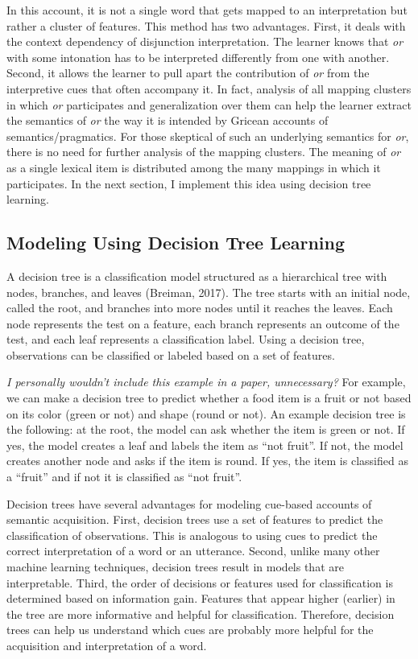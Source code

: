 \documentclass[floatsintext,man]{apa6}
\theoremstyle{definition}
\theoremstyle{definition}
\theoremstyle{definition}
\theoremstyle{remark}
\begin{document}
In this account, it is not a single word that gets mapped to an
interpretation but rather a cluster of features. This method has two
advantages. First, it deals with the context dependency of disjunction
interpretation. The learner knows that \emph{or} with some intonation
has to be interpreted differently from one with another. Second, it
allows the learner to pull apart the contribution of \emph{or} from the
interpretive cues that often accompany it. In fact, analysis of all
mapping clusters in which \emph{or} participates and generalization over
them can help the learner extract the semantics of \emph{or} the way it
is intended by Gricean accounts of semantics/pragmatics. For those
skeptical of such an underlying semantics for \emph{or}, there is no
need for further analysis of the mapping clusters. The meaning of
\emph{or} as a single lexical item is distributed among the many
mappings in which it participates. In the next section, I implement this
idea using decision tree learning.

\subsection{Modeling Using Decision Tree Learning}\label{DecisionTrees}

A decision tree is a classification model structured as a hierarchical
tree with nodes, branches, and leaves (Breiman, 2017). The tree starts
with an initial node, called the root, and branches into more nodes
until it reaches the leaves. Each node represents the test on a feature,
each branch represents an outcome of the test, and each leaf represents
a classification label. Using a decision tree, observations can be
classified or labeled based on a set of features.

\emph{I personally wouldn't include this example in a paper,
unnecessary?} For example, we can make a decision tree to predict
whether a food item is a fruit or not based on its color (green or not)
and shape (round or not). An example decision tree is the following: at
the root, the model can ask whether the item is green or not. If yes,
the model creates a leaf and labels the item as \enquote{not fruit}. If
not, the model creates another node and asks if the item is round. If
yes, the item is classified as a \enquote{fruit} and if not it is
classified as \enquote{not fruit}.

Decision trees have several advantages for modeling cue-based accounts
of semantic acquisition. First, decision trees use a set of features to
predict the classification of observations. This is analogous to using
cues to predict the correct interpretation of a word or an utterance.
Second, unlike many other machine learning techniques, decision trees
result in models that are interpretable. Third, the order of decisions
or features used for classification is determined based on information
gain. Features that appear higher (earlier) in the tree are more
informative and helpful for classification. Therefore, decision trees
can help us understand which cues are probably more helpful for the
acquisition and interpretation of a word.
\end{document}
